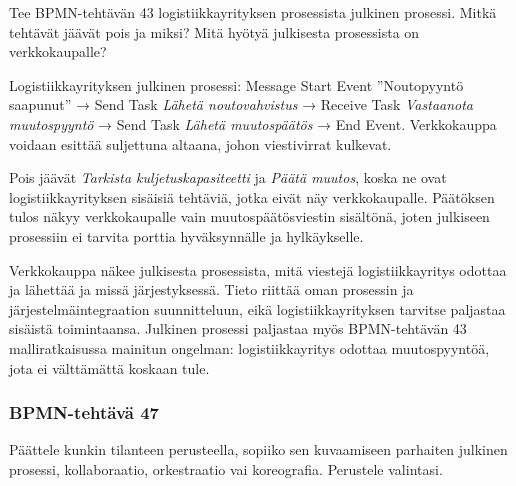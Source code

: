 \documentclass[
  finnish,
  letterpaper,
  DIV=11,
  numbers=noendperiod,
  oneside]{scrreprt}
\begin{document}
Tee BPMN-tehtävän 43 logistiikkayrityksen prosessista julkinen prosessi.
Mitkä tehtävät jäävät pois ja miksi? Mitä hyötyä julkisesta prosessista
on verkkokaupalle?

\begin{tcolorbox}[enhanced jigsaw, arc=.35mm, bottomrule=.15mm, bottomtitle=1mm, breakable, colback=white, colbacktitle=quarto-callout-tip-color!10!white, colframe=quarto-callout-tip-color-frame, coltitle=black, left=2mm, leftrule=.75mm, opacityback=0, opacitybacktitle=0.6, rightrule=.15mm, title=\textcolor{quarto-callout-tip-color}{\faLightbulb}\hspace{0.5em}{Malliratkaisu}, titlerule=0mm, toprule=.15mm, toptitle=1mm]

Logistiikkayrityksen julkinen prosessi: Message Start Event
''Noutopyyntö saapunut'' → Send Task \emph{Lähetä noutovahvistus} →
Receive Task \emph{Vastaanota muutospyyntö} → Send Task \emph{Lähetä
muutospäätös} → End Event. Verkkokauppa voidaan esittää suljettuna
altaana, johon viestivirrat kulkevat.

Pois jäävät \emph{Tarkista kuljetuskapasiteetti} ja \emph{Päätä muutos},
koska ne ovat logistiikkayrityksen sisäisiä tehtäviä, jotka eivät näy
verkkokaupalle. Päätöksen tulos näkyy verkkokaupalle vain
muutospäätösviestin sisältönä, joten julkiseen prosessiin ei tarvita
porttia hyväksynnälle ja hylkäykselle.

Verkkokauppa näkee julkisesta prosessista, mitä viestejä
logistiikkayritys odottaa ja lähettää ja missä järjestyksessä. Tieto
riittää oman prosessin ja järjestelmäintegraation suunnitteluun, eikä
logistiikkayrityksen tarvitse paljastaa sisäistä toimintaansa. Julkinen
prosessi paljastaa myös BPMN-tehtävän 43 malliratkaisussa mainitun
ongelman: logistiikkayritys odottaa muutospyyntöä, jota ei välttämättä
koskaan tule.

\end{tcolorbox}

\subsubsection{BPMN-tehtävä 47}\label{bpmn-tehtuxe4vuxe4-47}

Päättele kunkin tilanteen perusteella, sopiiko sen kuvaamiseen parhaiten
julkinen prosessi, kollaboraatio, orkestraatio vai koreografia.
Perustele valintasi.
\end{document}
